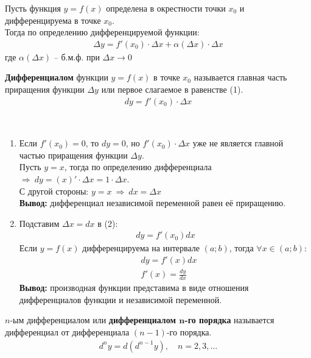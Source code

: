 Пусть функция $y=f(x)$ определена в окрестности точки $x_0$ и дифференцируема в точке $x_0$.\\
Тогда по определению дифференцируемой функции: \begin{align}
	\Delta y = f'(x_0) \cdot \Delta x + \alpha (\Delta x) \cdot \Delta x
\end{align}
где $\alpha (\Delta x)$ -- б.м.ф. при $\Delta x \to 0$
\begin{definition}
	\textbf{Дифференциалом} функции $y=f(x)$ в точке $x_0$ называется главная часть приращения функции $\Delta y$ или первое слагаемое в равенстве (1).
	\begin{align}
		\boxed{dy = f'(x_0) \cdot \Delta x}
	\end{align}
\end{definition}
\begin{note}\ \\ \vspace{-1.5\topsep}
  \begin{enumerate}
    \item Если $f'(x_0) = 0$, то $dy = 0$, но $f'(x_0) \cdot \Delta x$ уже не является главной частью приращения функции $\Delta y$.\\
    Пусть $y=x$, тогда по определению дифференциала $\Rightarrow\ dy = (x)' \cdot \Delta x = 1 \cdot \Delta x$. \\
    С другой стороны: $y = x\ \Rightarrow\ \boxed{dx = \Delta x}$\\
    \textbf{Вывод:} дифференциал независимой переменной равен её приращению.
    \item Подставим $\Delta x = dx$ в (2):
    \begin{align}
      \boxed{dy = f'(x_0)dx}
    \end{align} 
    Если $y=f(x)$ дифференцируема на интервале $(a;b)$, тогда $\forall x \in (a;b)\colon$
    \begin{align}
      &\boxed{dy = f'(x)dx}\\
      &\boxed{f'(x) = \frac{dy}{dx}}
    \end{align}
    \textbf{Вывод:} производная функции представима в виде отношения дифференциалов функции и независимой переменной.
  \end{enumerate}
\end{note}
\setcounter{equation}{0}

\begin{definition}
  $n$-ым дифференциалом или \textbf{дифференциалом $\bm{n}$-го порядка} называется дифференциал от дифференциала $(n-1)$-го порядка.
  \begin{gather*}
    d^ny = d(d^{n-1}y), \quad n=2,3,\ldots
  \end{gather*} 
\end{definition}

